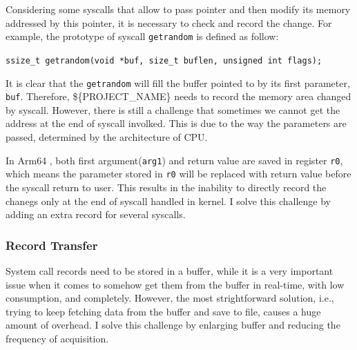 Considering some syscalls that allow to pass pointer and then modify its memory addressed by this pointer, it is necessary to check and record the change. For example, the prototype of syscall \texttt{getrandom} is defined as follow:\cite{getrandom2}


\centerline{\texttt{ssize\_t getrandom(void *buf, size\_t buflen, unsigned int flags);}}

It is clear that the \texttt{getrandom} will fill the buffer pointed to by its first parameter, \texttt{buf}. Therefore, \$\{PROJECT\_NAME\} needs to record the memory area changed by syscall. However, there is still a challenge that sometimes we cannot get the address at the end of syscall involked. This is due to the way the parameters are passed, determined by the architecture of CPU.

In Arm64 \cite{syscall}, both first argument(\texttt{arg1}) and return value are saved in register \texttt{r0}, which means the parameter stored in \texttt{r0} will be replaced with return value before the syscall return to user. This results in the inability to directly record the chanegs only at the end of syscall handled in kernel. I solve this challenge by adding an extra record for several syscalls.




\subsubsection{Record Transfer}

System call records need to be stored in a buffer, while it is a very important issue when it comes to somehow get them from the buffer in real-time, with low consumption, and completely. However, the most strightforward solution, i.e., trying to keep fetching data from the buffer and save to file, causes a huge amount of overhead. I solve this challenge by enlarging buffer and reducing the frequency of acquisition.





